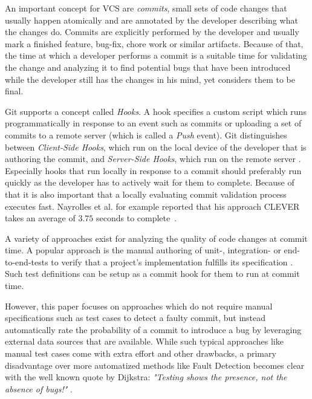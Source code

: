An important concept for VCS are \textit{commits}, small sets of code changes that usually happen atomically and are annotated by the developer describing what the changes do. Commits are explicitly performed by the developer and usually mark a finished feature, bug-fix, chore work or similar artifacts. Because of that, the time at which a developer performs a commit is a suitable time for validating the change and analyzing it to find potential bugs that have been introduced while the developer still has the changes in his mind, yet considers them to be final. %

Git supports a concept called \textit{Hooks}. A hook specifies a custom script which runs programmatically in response to an event such as commits or uploading a set of commits to a remote server (which is called a \textit{Push} event). 
Git distinguishes between \textit{Client-Side Hooks}, which run on the local device of the developer that is authoring the commit, and \textit{Server-Side Hooks}, which run on the remote server \cite{Chacon:2014:PG:2695634}. 
Especially hooks that run locally in response to a commit should preferably run quickly as the developer has to actively wait for them to complete. Because of that it is also important that a locally evaluating commit validation process executes fast. Nayrolles et al. for example reported that his approach CLEVER takes an average of $3.75$ seconds to complete~\cite{Nayrolles2018}.

A variety of approaches exist
for analyzing the quality of code changes at commit time. A popular approach is the manual authoring of unit-, integration- or end-to-end-tests to verify that a project's implementation fulfills its specification \cite{Maayan2018}. Such test definitions can be setup as a commit hook for them to run at commit time.

However, this paper focuses on approaches which do not require manual specifications such as test cases to detect a faulty commit, but instead automatically rate the probability of a commit to introduce a bug by leveraging external data sources that are available.
While such typical approaches like manual test cases come with extra effort and other drawbacks, a primary disadvantage over more automatized methods like Fault Detection becomes clear with the well known quote by Dijkstra: \textit{"Testing shows the presence, not the absence of bugs!"} \cite[p.~16]{JohnN1969}.

